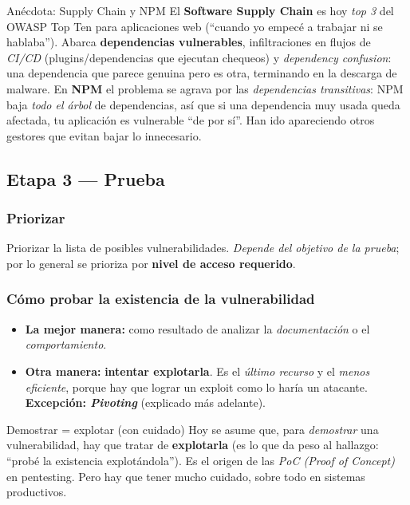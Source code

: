 \documentclass[11pt,a4paper]{article}
\begin{document}
\begin{warnbox}{Anécdota: Supply Chain y NPM}
El \textbf{Software Supply Chain} es hoy \emph{top 3} del OWASP Top Ten para aplicaciones web
(``cuando yo empecé a trabajar ni se hablaba''). Abarca \textbf{dependencias vulnerables},
infiltraciones en flujos de \emph{CI/CD} (plugins/dependencias que ejecutan chequeos) y
\emph{dependency confusion}: una dependencia que parece genuina pero es otra, terminando en
la descarga de malware. En \textbf{NPM} el problema se agrava por las \emph{dependencias
transitivas}: NPM baja \emph{todo el árbol} de dependencias, así que si una dependencia muy
usada queda afectada, tu aplicación es vulnerable ``de por sí''. Han ido apareciendo otros
gestores que evitan bajar lo innecesario.
\end{warnbox}

\subsection{Etapa 3 — Prueba}

\subsubsection*{Priorizar}
Priorizar la lista de posibles vulnerabilidades. \emph{Depende del objetivo de la prueba};
por lo general se prioriza por \textbf{nivel de acceso requerido}.

\subsubsection*{Cómo probar la existencia de la vulnerabilidad}
\begin{itemize}[leftmargin=1.6em,itemsep=2pt]
  \item \textbf{La mejor manera:} como resultado de analizar la \emph{documentación} o el
        \emph{comportamiento}.
  \item \textbf{Otra manera:} \textbf{intentar explotarla}. Es el \emph{último recurso} y el
        \emph{menos eficiente}, porque hay que lograr un exploit como lo haría un atacante.
        \textbf{Excepción: \emph{Pivoting}} (explicado más adelante).
\end{itemize}

\begin{notebox}{Demostrar = explotar (con cuidado)}
Hoy se asume que, para \emph{demostrar} una vulnerabilidad, hay que tratar de
\textbf{explotarla} (es lo que da peso al hallazgo: ``probé la existencia explotándola''). Es
el origen de las \emph{PoC (Proof of Concept)} en pentesting. Pero hay que tener mucho
cuidado, sobre todo en sistemas productivos.
\end{notebox}
\end{document}
